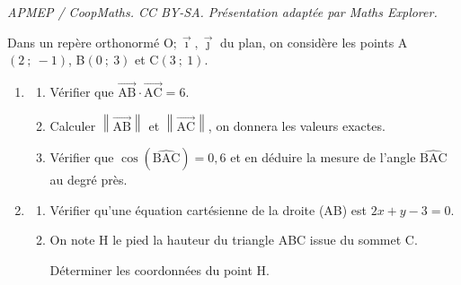 \documentclass[10pt]{article}
\providecommand{\vv}[1]{\overrightarrow{#1}}
\providecommand{\vv}[1]{{\overrightarrow{#1}}}
\providecommand{\Oij}{\(\mathrm{O};\vec{\imath},\vec{\jmath}\)}
\begin{document}
\noindent\textit{APMEP / CoopMaths. CC BY-SA. Présentation adaptée par Maths Explorer.}\par\medskip
\medskip

Dans un repère orthonormé \Oij{} du plan, on considère les points A$(2~;~-1)$,
B$(0~;~3)$ et C$(3~;~1)$.
\begin{enumerate}
\item \begin{enumerate}
		\item Vérifier que $\vv{\text{AB}}\cdot\vv{\text{AC}} = 6$.


		\item Calculer $\left\|\vv{\text{AB}}\right\|$ et $\left\|\vv{\text{AC}}\right\|$, on donnera les valeurs exactes.



		\item Vérifier que $\cos(\widehat{\text{BAC}}) = 0,6$ et en déduire la mesure de l'angle $\widehat{\text{BAC}}$ au degré près.







		\end{enumerate}
\item 
	\begin{enumerate}
		\item Vérifier qu'une équation cartésienne de la droite (AB) est $2x + y - 3 = 0$.

















		\item On note H le pied la hauteur du triangle ABC issue du sommet C.

Déterminer les coordonnées du point H.






















	\end{enumerate}
\end{enumerate}

\vspace{0,5cm}
\end{document}
